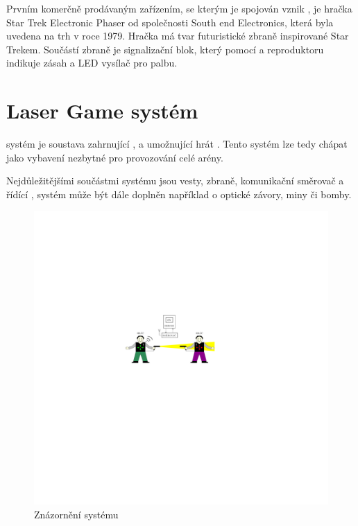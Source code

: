 Prvním komerčně prodávaným zařízením, se kterým je spojován vznik , je hračka Star Trek Electronic Phaser od společnosti South end Electronics, která byla uvedena na trh v roce 1979. Hračka má tvar futuristické zbraně inspirované Star Trekem. Součástí zbraně je signalizační blok, který pomocí  a reproduktoru indikuje zásah a  LED vysílač pro palbu.

\section{Laser Game systém}
 systém je soustava zahrnující ,  a  umožnující hrát . Tento systém lze tedy chápat jako vybavení nezbytné pro provozování celé arény.

Nejdůležitějšími součástmi  systému jsou vesty, zbraně, komunikační směrovač a řídící ,  systém může být dále doplněn například o optické závory, miny či bomby.

\begin{figure}[H]
    \begin{center}
        \includegraphics[width=\textwidth]{img/lgs}
    \end{center}
    \caption{Znázornění  systému}
\end{figure}

